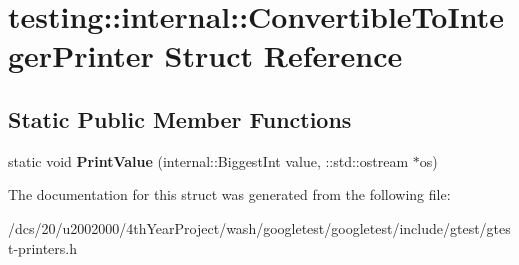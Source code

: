 \hypertarget{structtesting_1_1internal_1_1ConvertibleToIntegerPrinter}{}\section{testing\+:\+:internal\+:\+:Convertible\+To\+Integer\+Printer Struct Reference}
\label{structtesting_1_1internal_1_1ConvertibleToIntegerPrinter}
\subsection*{Static Public Member Functions}
\begin{DoxyCompactItemize}
\item 
\mbox{\label{structtesting_1_1internal_1_1ConvertibleToIntegerPrinter_ab3f4b6152a8799f455de22de2577652e}} 
static void {\bfseries Print\+Value} (internal\+::\+Biggest\+Int value, \+::std\+::ostream $\ast$os)
\end{DoxyCompactItemize}


The documentation for this struct was generated from the following file\+:\begin{DoxyCompactItemize}
\item 
/dcs/20/u2002000/4th\+Year\+Project/wash/googletest/googletest/include/gtest/gtest-\/printers.\+h\end{DoxyCompactItemize}
